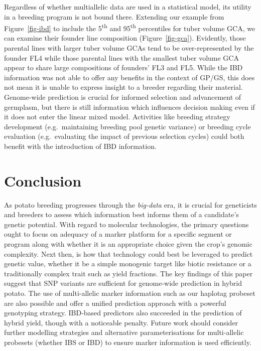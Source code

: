 Regardless of whether multiallelic data are used in a statistical model,
its utility in a breeding program is not bound there. Extending our example from Figure~\ref{fig-ibd} to include the 5\textsuperscript{th} and 95\textsuperscript{th} percentiles for tuber volume GCA, we can examine their founder line composition (Figure~\ref{fig-gca}).
Evidently, those parental lines with larger tuber volume GCAs tend to
be over-represented by the founder FL4 while those parental lines with
the smallest tuber volume GCA appear to share large compositions of
founders' FL3 and FL5. While the IBD information was not able to
offer any benefits in the context of GP/GS, this does not mean it is
unable to express insight to a breeder regarding their material.
Genome-wide prediction is crucial for informed selection and advancement
of germplasm, but there is still information which influences decision
making even if it does not enter the linear mixed model. Activities like breeding strategy development (e.g.~maintaining breeding pool genetic variance) or breeding cycle evaluation (e.g.~evaluating the impact of previous selection cycles) could both benefit with the introduction of IBD information.

\hypertarget{conclusion}{%
\section{Conclusion}\label{conclusion}}

As potato breeding progresses through the \emph{big-data} era, it is
crucial for geneticists and breeders to assess which information best
informs them of a candidate's genetic potential. With regard to
molecular technologies, the primary questions ought to focus on adequacy
of a marker platform for a specific segment or program along with
whether it is an appropriate choice given the crop's genomic complexity.
Next then, is how that technology could best be leveraged to predict
genetic value, whether it be a simple monogenic target like biotic
resistance or a traditionally complex trait such as yield fractions. The
key findings of this paper suggest that SNP variants are sufficient for
genome-wide prediction in hybrid potato. The use of multi-allelic marker
information such as our haplotag probeset are also possible and offer a
unified prediction approach with a powerful genotyping strategy.
IBD-based predictors also succeeded in the prediction of hybrid yield,
though with a noticeable penalty. Future work should consider further
modelling strategies and alternative parameterisations for multi-allelic
probesets (whether IBS or IBD) to ensure marker information is used
efficiently.






